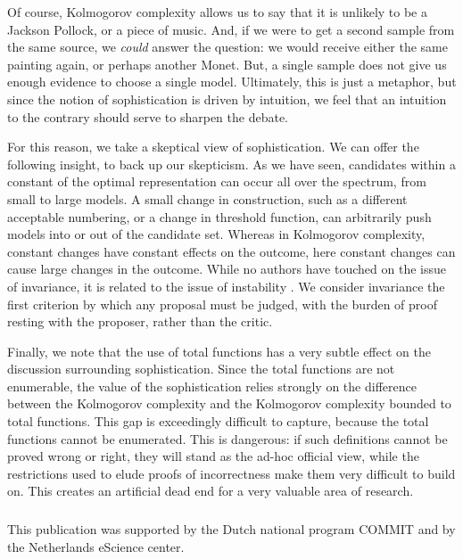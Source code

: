 \documentclass{style/llncs}
\begin{document}
Of course, Kolmogorov complexity allows us to say that it is unlikely to be a Jackson Pollock, or a piece of music. And, if we were to get a second sample from the same source, we \emph{could} answer the question: we would receive either the same painting again, or perhaps another Monet. But, a single sample does not give us enough evidence to choose a single model. Ultimately, this is just a metaphor, but since the notion of sophistication is driven by intuition, we feel that an intuition to the contrary should serve to sharpen the debate.

For this reason, we take a skeptical view of sophistication. We can offer the following insight, to back up our skepticism. As we have seen, candidates within a constant of the optimal representation can occur all over the spectrum, from small to large models. A small change in construction, such as a different acceptable numbering, or a change in threshold function, can arbitrarily push models into or out of the candidate set. Whereas in Kolmogorov complexity, constant changes have constant effects on the outcome, here constant changes can cause large changes in the outcome. While no authors have touched on the issue of invariance, it is related to the issue of instability \cite{antunes2013sophistication,vereshchagin2013algorithmic}. We consider invariance the first criterion by which any proposal must be judged, with the burden of proof resting with the proposer, rather than the critic.

Finally, we note that the use of total functions has a very subtle effect on the discussion surrounding sophistication. Since the total functions are not enumerable, the value of the sophistication relies strongly on the difference between the Kolmogorov complexity and the Kolmogorov complexity bounded to total functions. This gap is exceedingly difficult to capture, because the total functions cannot be enumerated. This is dangerous: if such definitions cannot be proved wrong or right, they will stand as the ad-hoc official view, while the restrictions used to elude proofs of incorrectness make them very difficult to build on. This creates an artificial dead end for a very valuable area of research. 

\subsubsection*{\ackname}

This publication was supported by the Dutch national program COMMIT and by  the Netherlands eScience center.
\end{document}
